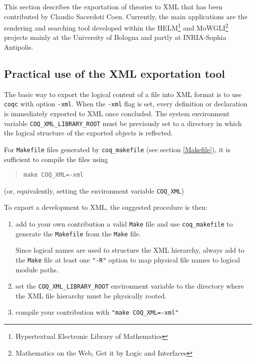 \label{Helm}

This section describes the exportation of {\Coq} theories to XML that
has been contributed by Claudio Sacerdoti Coen.  Currently, the main
applications are the rendering and searching tool
developed within the HELM\footnote{Hypertextual Electronic Library of
Mathematics} and MoWGLI\footnote{Mathematics on the Web, Get it by
Logic and Interfaces} projects mainly at the University of Bologna and
partly at INRIA-Sophia Antipolis.

\subsection{Practical use of the XML exportation tool}

The basic way to export the logical content of a file into XML format
is to use {\tt coqc} with option {\tt -xml}. 
When the {\tt -xml} flag is set, every definition or declaration is
immediately exported to XML once concluded.
The system environment variable {\tt COQ\_XML\_LIBRARY\_ROOT} must be
previously set to a directory in which the logical structure of the
exported objects is reflected.

  For {\tt Makefile} files generated by \verb+coq_makefile+ (see section
  \ref{Makefile}), it is sufficient to compile the files using
 \begin{quotation}
   \verb+make COQ_XML=-xml+
 \end{quotation}
 (or, equivalently, setting the environment variable \verb+COQ_XML+)
 
 To export a development to XML, the suggested procedure is then:
 
 \begin{enumerate}
  \item add to your own contribution a valid \verb+Make+ file and use
      \verb+coq_makefile+ to generate the \verb+Makefile+ from the \verb+Make+
      file.
 
      \Warning Since logical names are used to structure the XML
      hierarchy, always add to the \verb+Make+ file at least one \verb+"-R"+
      option to map physical file names to logical module paths.
  \item set the \verb+COQ_XML_LIBRARY_ROOT+ environment variable to
  the directory where the XML file hierarchy must be physically
  rooted.
  \item compile your contribution with \verb+"make COQ_XML=-xml"+
 \end{enumerate}
 
